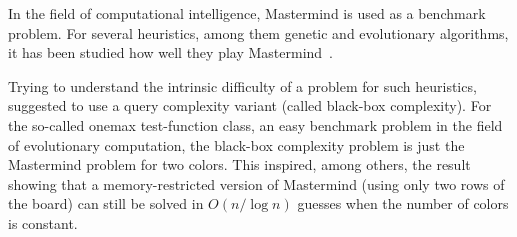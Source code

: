 \documentclass[english,a4paper,11pt]{article}
\newcommand{\comment}[1]{{\bf [#1]}}
\newcommand{\RS}[1]{\comment{\textcolor{red}{RS: #1}}}
\newcommand{\BD}[1]{\comment{\textcolor{blue}{BD: #1}}}
\newcommand{\ifLongCites}[2]{#1}
\newcommand{\ifLongCites}[2]{#2}
\begin{document}
{In the field of computational intelligence, Mastermind is used as a benchmark problem. For several heuristics, among them genetic and evolutionary algorithms, it has been studied how well they play Mastermind~\cite{KaliskerC03,KovacsT03,Berghman09,GuervosCM11,GuervosMC11}.

Trying to understand the intrinsic difficulty of a problem for such heuristics, \ifLongCites{\cite{DrosteJW06}}{Droste, Jansen, and Wegener~\cite{DrosteJW06}} suggested to use a query complexity variant (called black-box complexity). For the so-called onemax test-function class, an easy benchmark problem in the field of evolutionary computation, the black-box complexity problem is just the Mastermind problem for two colors. This inspired, among others, the result~\cite{DoerrW12} showing that a memory-restricted version of Mastermind (using only two rows of the board) can still be solved in $O(n / \log n)$ guesses when the number of colors is constant.
%


}
\end{document}
